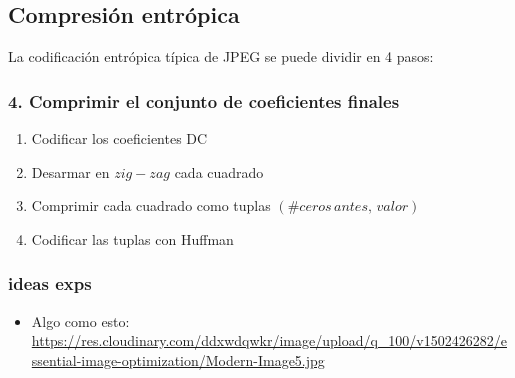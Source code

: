 \documentclass{beamer}
\begin{document}
\subsection{Compresión entrópica}
\begin{frame}
    La codificación entrópica típica de JPEG se puede dividir en 4 pasos:
    \frametitle{4. Comprimir el conjunto de coeficientes finales}
    \begin{enumerate}
        \item Codificar los coeficientes DC
        \item Desarmar en $zig-zag$ cada cuadrado
        \item Comprimir cada cuadrado como tuplas $(\# ceros \, antes, \, valor)$
        \item Codificar las tuplas con Huffman

    \end{enumerate}
\end{frame}
\begin{frame}
    \frametitle{ideas exps}
    \begin{itemize}
        \item Algo como esto:
            \url{https://res.cloudinary.com/ddxwdqwkr/image/upload/q_100/v1502426282/essential-image-optimization/Modern-Image5.jpg}
    \end{itemize}

\end{frame}
\end{document}

